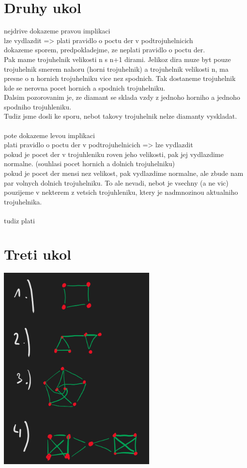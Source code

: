 \documentclass[a4paper]{article}
\begin{document}
\section*{Druhy ukol}
nejdrive dokazeme pravou implikaci\\
lze vydlazdit => plati pravidlo o poctu der v podtrojuhelnicich\\
dokazeme sporem, predpokladejme, ze neplati pravidlo o poctu der.\\
Pak mame trojuhelnik velikosti n s n+1 dirami.
Jelikoz dira muze byt pouze trojuhelnik smerem nahoru (horni trojuhelnik) a
trojuhelnik velikosti n, ma presne o n hornich trojuhelniku vice nez spodnich.
Tak dostaneme trojuhelnik kde se nerovna pocet hornich a spodnich trojuhelniku.\\
Dalsim pozorovanim je, ze diamant se sklada vzdy z jednoho horniho a jednoho spodniho trojuhleniku.\\
Tudiz jsme dosli ke sporu, nebot takovy trojuhelnik nelze diamanty vyskladat.\\
\\
pote dokazeme levou implikaci\\
plati pravidlo o poctu der v podtrojuhelnicich => lze vydlazdit\\
pokud je pocet der v trojuhleniku roven jeho velikosti, pak jej vydlazdime normalne. (souhlasi pocet hornich a dolnich trojuhelniku)\\
pokud je pocet der mensi nez velikost, pak vydlazdime normalne, ale zbude nam par volnych dolnich trojuhelniku.
To ale nevadi, nebot je vsechny (a ne vic) pouzijeme v nekterem z vetsich trojuhleniku, ktery je nadmnozinou aktualniho trojuhelnika.\\
\\
tudiz plati

\section*{Treti ukol}
\includegraphics[width=300px]{HW5grafy.png}
\end{document}
